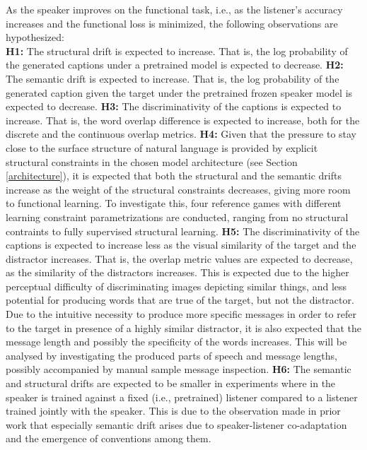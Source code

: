 As the speaker improves on the functional task, i.e., as the listener's accuracy increases and the functional loss is minimized, the following observations are hypothesized: \\
\newline 
\textbf{H1:} The structural drift is expected to increase. That is, the log probability of the generated captions under a pretrained model is expected to decrease. \newline
\textbf{H2:} The semantic drift is expected to increase. That is, the log probability of the generated caption given the target under the pretrained frozen speaker model is expected to decrease. \newline
\textbf{H3:} The discriminativity of the captions is expected to increase. That is, the word overlap difference is expected to increase, both for the discrete and the continuous overlap metrics. \newline
\textbf{H4:} Given that the pressure to stay close to the surface structure of natural language is provided by explicit structural constraints in the chosen model architecture (see Section \ref{architecture}), it is expected that both the structural and the semantic drifts increase as the weight of the structural constraints decreases, giving more room to functional learning. To investigate this, four reference games with different learning constraint parametrizations are conducted, ranging from no structural contraints to fully supervised structural learning. \newline
\textbf{H5:} The discriminativity of the captions is expected to increase less as the visual similarity of the target and the distractor increases. That is, the overlap metric values are expected to decrease, as the similarity of the distractors increases. This is expected due to the higher perceptual difficulty of discriminating images depicting similar things, and less potential for producing words that are true of the target, but not the distractor. Due to the intuitive necessity to produce more specific messages in order to refer to the target in presence of a highly similar distractor, it is also expected that the message length and possibly the specificity of the words increases. This will be analysed by investigating the produced parts of speech and message lengths, possibly accompanied by manual sample message inspection.\newline
\textbf{H6:}  The semantic and structural drifts are expected to be smaller in experiments where in the speaker is trained against a fixed (i.e., pretrained) listener compared to a listener trained jointly with the speaker. This is due to the observation made in prior work that especially semantic drift arises due to speaker-listener co-adaptation and the emergence of conventions among them. \newline
